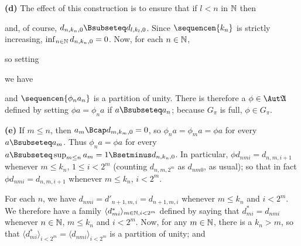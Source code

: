 {\medskip
     
{\bf (d)} The effect of this construction is to ensure that if $l<n$ in
$\Bbb N$ then
     
     
     
     
\noindent and, of course, $d_{n,k_n,0}\Bsubseteq d_{l,k_l,0}$.   Since
$\sequencen{k_n}$ is strictly increasing, $\inf_{n\in\Bbb
N}d_{n,k_n,0}=0$.   Now, for each $n\in\Bbb N$,
     
     
\noindent so setting
     
     
\noindent we have
     
     
\noindent and $\sequencen{\phi_na_n}$ is a partition of unity.
There is therefore
a $\phi\in\Aut\frak A$ defined by setting $\phi a=\phi_na$ if
$a\Bsubseteq a_n$;  because $G_{\pi}$ is full, $\phi\in G_{\pi}$.
     
\medskip
     
{\bf (e)} If $m\le n$, then $a_m\Bcap d_{m,k_m,0}=0$, so
$\phi_na=\phi_ma=\phi a$ for every $a\Bsubseteq a_m$.   Thus
$\phi_na=\phi a$ for
every $a\Bsubseteq\sup_{m\le n}a_m=1\Bsetminus d_{n,k_n,0}$.   In
particular, $\phi d_{nmi}=d_{n,m,i+1}$ whenever $m\le k_n$, $1\le i<2^m$
(counting $d_{n,m,2^m}$ as $d_{nm0}$, as usual);  so that in fact
$\phi d_{nmi}=d_{n,m,i+1}$ whenever $m\le k_n$, $i<2^m$.
     
For each $n$, we have $d_{nmi}=d'_{n+1,m,i}=d_{n+1,m,i}$ whenever
$m\le k_n$ and $i<2^m$.   We therefore have a family
$\langle d^*_{mi} \rangle_{m\in\Bbb N,i<2^m}$ defined by saying that
$d^*_{mi}=d_{nmi}$
whenever $n\in\Bbb N$, $m\le k_n$ and $i<2^m$.   Now, for any
$m\in \Bbb N$, there is a $k_n>m$, so that
$\langle d^*_{mi}\rangle_{i<2^m}
=\langle d_{nmi}\rangle_{i<2^m}$ is a partition of unity;  and
     
}
